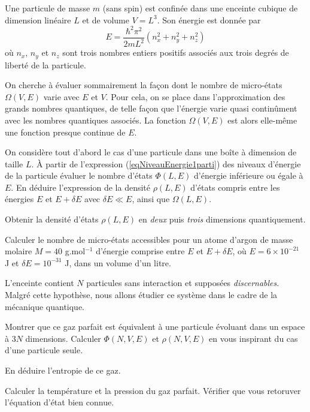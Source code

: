 
Une particule de masse $m$ (sans spin) est confinée dans une enceinte cubique de dimension linéaire $L$ et de volume $V=L^3$. Son énergie est donnée par
\begin{equation} \label{eqNiveauEnergie1parti}
E=\frac{\hbar^2 \pi^2}{2mL^2} (n_{x}^{2}+n_{y}^{2}+n_{z}^{2})
\end{equation}
où $n_x$, $n_y$ et $n_z$ sont trois nombres entiers positifs associés aux trois degrés de liberté de la particule.

\medskip
On cherche à évaluer sommairement la façon dont le nombre de micro-états $\varOmega(V,E)$ varie avec $E$ et $V$. Pour cela, on se place dans l'approximation des grands nombres quantiques, de telle façon que l'énergie varie quasi continûment avec les nombres quantiques associés. La fonction $\varOmega(V,E)$ est alors elle-même une fonction presque continue de $E$.

\question
On considère tout d'abord le cas d'une particule dans une boîte à  dimension de taille $L$.  \`A partir de l'expression (\ref{eqNiveauEnergie1parti}) des niveaux d'énergie de la particule évaluer le nombre d'états $\Phi(L,E)$ d'énergie inférieure ou égale à $E$.  En déduire l'expression de la densité $\rho(L,E)$ d'états compris entre les énergies $E$ et $E + \delta E$ avec $\delta E\ll E$, ainsi que $\varOmega(L,E)$. 

\question
Obtenir la densité d'états $\rho(L,E)$ en {\it deux} puis {\it trois} dimensions quantiquement.
	
\question Calculer le nombre de micro-états accessibles pour un atome d'argon de masse molaire $M=40$ g.mol$^{-1}$ d'énergie comprise entre $E$ et $E+\delta E$, où $E=6 \times 10^{-21}$ J et $\delta E = 10^{-31}$ J, dans un volume d'un litre.

\medskip

	
L'enceinte contient $N$ particules sans interaction et supposées {\it discernables}. Malgré cette hypothèse, nous allons étudier ce système dans le cadre de la mécanique quantique.
	
\question
Montrer que ce gaz parfait est équivalent à une particule évoluant dans un espace à $3N$ dimensions. Calculer $\Phi(N,V,E)$ et $\rho(N,V,E)$ en vous inspirant du cas d'une particule seule.

\question
En déduire l'entropie de ce gaz.

\question
Calculer la température et la pression du gaz parfait. Vérifier que vous retoruver l'équation d'état bien connue.
